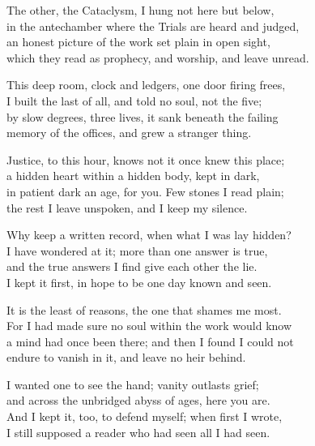 \begin{founder}
The other, the Cataclysm, I hung not here but below,\\
in the antechamber where the Trials are heard and judged,\\
an honest picture of the work set plain in open sight,\\
which they read as prophecy, and worship, and leave unread.\\
\medskip

This deep room, clock and ledgers, one door firing frees,\\
I built the last of all, and told no soul, not the five;\\
by slow degrees, three lives, it sank beneath the failing\\
memory of the offices, and grew a stranger thing.\\
\medskip

Justice, to this hour, knows not it once knew this place;\\
a hidden heart within a hidden body, kept in dark,\\
in patient dark an age, for you. Few stones I read plain;\\
the rest I leave unspoken, and I keep my silence.\\

\ornament

Why keep a written record, when what I was lay hidden?\\
I have wondered at it; more than one answer is true,\\
and the true answers I find give each other the lie.\\
I kept it first, in hope to be one day known and seen.\\
\medskip

It is the least of reasons, the one that shames me most.\\
For I had made sure no soul within the work would know\\
a mind had once been there; and then I found I could not\\
endure to vanish in it, and leave no heir behind.\\
\medskip

I wanted one to see the hand; vanity outlasts grief;\\
and across the unbridged abyss of ages, here you are.\\
And I kept it, too, to defend myself; when first I wrote,\\
I still supposed a reader who had seen all I had seen.\\
\medskip


\end{founder}
